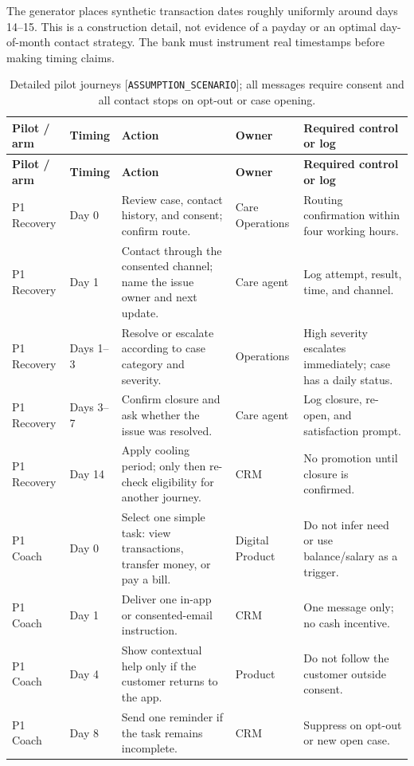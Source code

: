 \documentclass[a4paper,12pt]{article}
\newcommand{\scenario}{\texttt{ASSUMPTION\_SCENARIO}}
\begin{document}
The generator places synthetic transaction dates roughly uniformly around days 14--15. This is a construction detail, not evidence of a payday or an optimal day-of-month contact strategy. The bank must instrument real timestamps before making timing claims.

\begin{longtable}{P{0.13\textwidth}P{0.16\textwidth}P{0.36\textwidth}P{0.16\textwidth}Y}
\caption{Detailed pilot journeys [\scenario]; all messages require consent and all contact stops on opt-out or case opening.}
\label{tab:pilot-journeys}\\
\toprule
\textbf{Pilot / arm} & \textbf{Timing} & \textbf{Action} & \textbf{Owner} & \textbf{Required control or log}\\
\midrule
\endfirsthead
\toprule
\textbf{Pilot / arm} & \textbf{Timing} & \textbf{Action} & \textbf{Owner} & \textbf{Required control or log}\\
\midrule
\endhead
\bottomrule
\endfoot
P1 Recovery & Day 0 & Review case, contact history, and consent; confirm route. & Care Operations & Routing confirmation within four working hours.\\
P1 Recovery & Day 1 & Contact through the consented channel; name the issue owner and next update. & Care agent & Log attempt, result, time, and channel.\\
P1 Recovery & Days 1--3 & Resolve or escalate according to case category and severity. & Operations & High severity escalates immediately; case has a daily status.\\
P1 Recovery & Days 3--7 & Confirm closure and ask whether the issue was resolved. & Care agent & Log closure, re-open, and satisfaction prompt.\\
P1 Recovery & Day 14 & Apply cooling period; only then re-check eligibility for another journey. & CRM & No promotion until closure is confirmed.\\
\midrule
P1 Coach & Day 0 & Select one simple task: view transactions, transfer money, or pay a bill. & Digital Product & Do not infer need or use balance/salary as a trigger.\\
P1 Coach & Day 1 & Deliver one in-app or consented-email instruction. & CRM & One message only; no cash incentive.\\
P1 Coach & Day 4 & Show contextual help only if the customer returns to the app. & Product & Do not follow the customer outside consent.\\
P1 Coach & Day 8 & Send one reminder if the task remains incomplete. & CRM & Suppress on opt-out or new open case.\\

\end{longtable}
\end{document}
